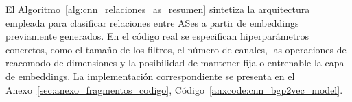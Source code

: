 




El Algoritmo~\ref{alg:cnn_relaciones_as_resumen} sintetiza la arquitectura empleada para clasificar relaciones entre ASes a partir de embeddings previamente generados. En el código real se especifican hiperparámetros concretos, como el tamaño de los filtros, el número de canales, las operaciones de reacomodo de dimensiones y la posibilidad de mantener fija o entrenable la capa de embeddings. La implementación correspondiente se presenta en el Anexo~\ref{sec:anexo_fragmentos_codigo}, Código~\ref{anxcode:cnn_bgp2vec_model}.

